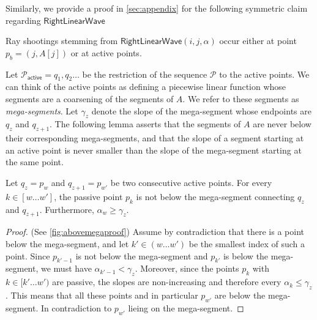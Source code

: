 \documentclass[a4paper,UKenglish,cleveref, autoref, thm-restate]{lipics-v2021}
\newcommand{\RLW}{\mathsf{RightLinearWave}}
\renewcommand{\P}{\mathcal{P}}
\newcommand{\AP}{\P_{\mathsf{active}}}
\begin{document}
Similarly, we provide a proof in \cref{sec:appendix} for the following symmetric claim regarding $\RLW$
\begin{lemma}\label{lem:activeraysright}
Ray shootings stemming from $\RLW(i,j,\alpha)$ occur either at point $p_b=(j,A[j])$ or at active points.
\end{lemma}

Let $\AP = q_1,q_2 \ldots$ be the restriction of the sequence $\P$ to the active points. 
We can think of the active points as defining a piecewise linear function whose segments are a coarsening of the segments of $A$. We refer to these segments as {\em mega-segments}. 
Let $\gamma_z$ denote the slope of the mega-segment whose endpoints are $q_z$ and $q_{z+1}$. 
The following lemma asserts that the segments of $A$ are never below their corresponding mega-segments, and that the slope of a segment starting at an active point is never smaller than the slope of the mega-segment starting at the same point. 

\begin{lemma} \label{lem:above-mega}
Let $q_z = p_w$ and $q_{z+1} = p_{w'}$ be two consecutive active points.
For every $k \in [w \ldots w']$, the passive point $p_k$ is not below the mega-segment connecting $q_z$ and $q_{z+1}$.
Furthermore, $\alpha_w \ge \gamma_z$.
\end{lemma}
\begin{proof}
(See \cref{fig:abovemegaproof}) Assume by contradiction that there is a point below the mega-segment, and let $k'\in (w\ldots w')$ be the smallest index of such a point.
Since $p_{k'-1}$ is not below the mega-segment and $p_{k'}$ is below the mega-segment, we must have $\alpha_{k'-1} < \gamma_z$.
Moreover, since the points $p_k$ with $k \in [k' \ldots w')$ are passive, the slopes are non-increasing and therefore every $\alpha_k \leq \gamma_z$.
This means that all these points and in particular $p_{w'}$ are below the mega-segment. In contradiction to $p_{w'}$ lieing on the mega-segment.
\end{proof}
\end{document}
